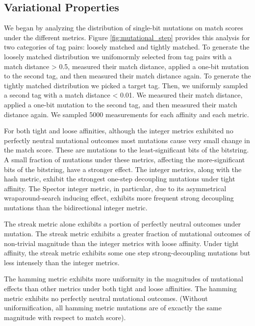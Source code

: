 

\subsection{Variational Properties}



We began by analyzing the distribution of single-bit mutations on match scores under the different metrics.
Figure \ref{fig:mutational_step} provides this analysis for two categories of tag pairs: loosely matched and tightly matched.
To generate the loosely matched distribution we unifomormly selected from tag pairs with a match distance > 0.5, measured their match distance, applied a one-bit mutation to the second tag, and then measured their match distance again.
To generate the tightly matched distribution we picked a target tag.
Then, we uniformly sampled a second tag with a match distance < 0.01.
We measured their match distance, applied a one-bit mutation to the second tag, and then measured their match distance again.
We sampled 5000 measurements for each affinity and each metric.

For both tight and loose affinities, although the integer metrics exhibited no perfectly neutral mutational outcomes most mutations cause very small change in the match score.
These are mutations to the least-significant bits of the bitstring.
A small fraction of mutations under these metrics, affecting the more-significant bits of the bitstring, have a stronger effect.
The integer metrics, along with the hash metric, exhibit the strongest one-step decoupling mutations under tight affinity.
The Spector integer metric, in particular, due to its asymmetrical wraparound-search inducing effect, exhibits more frequent strong decoupling mutations than the bidirectional integer metric.

The streak metric alone exhibits a portion of perfectly neutral outcomes under mutation.
The streak metric exhibits a greater fraction of mutational outcomes of non-trivial magnitude than the integer metrics with loose affinity.
Under tight affinity, the streak metric exhibits some one step strong-decoupling mutations but less intensely than the integer metrics.

The hamming metric exhibits more uniformity in the magnitudes of mutational effects than other metrics under both tight and loose affinities.
The hamming metric exhibits no perfectly neutral mutational outcomes.
(Without uniformification, all hamming metric mutations are of excactly the same magnitude with respect to match score).

